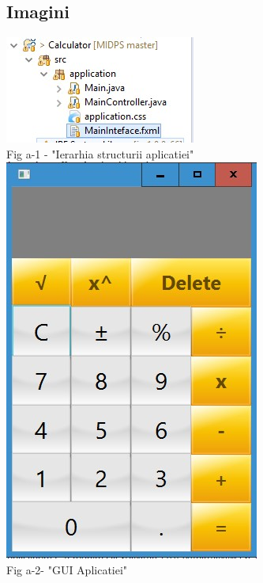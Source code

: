 \subsection{Imagini}
\begin{center}
\vspace{30 mm}
\includegraphics[scale=1.5]{a_1} \\ 
Fig a-1 - "Ierarhia structurii aplicatiei" \\
\vspace{10 mm}
\includegraphics[scale=0.85]{a-2} \\
Fig a-2- "GUI Aplicatiei" \\
\vspace{10 mm}

\end{center}
